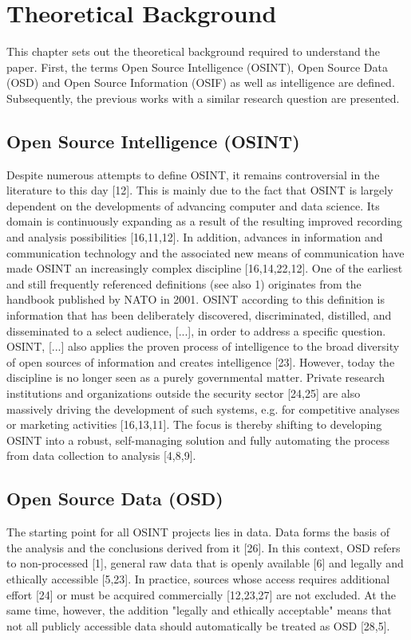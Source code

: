 \documentclass[10pt]{article}
\begin{document}
\section{Theoretical Background}

This chapter sets out the theoretical background required to understand the paper. First, the terms Open Source Intelligence (OSINT), Open Source Data (OSD) and Open Source Information (OSIF) as well as intelligence are defined. Subsequently, the previous works with a similar research question are presented.

\subsection{Open Source Intelligence (OSINT)}

Despite numerous attempts to define OSINT, it remains controversial in the literature to this day [12]. This is mainly due to the fact that OSINT is largely dependent on the developments of advancing computer and data science. Its domain is continuously expanding as a result of the resulting improved recording and analysis possibilities [16,11,12]. In addition, advances in information and communication technology and the associated new means of communication have made OSINT an increasingly complex discipline [16,14,22,12]. One of the earliest and still frequently referenced definitions (see also 1) originates from the handbook published by NATO in 2001. OSINT according to this definition is information that has been deliberately discovered, discriminated, distilled, and disseminated to a select audience, [...], in order to address a specific question. OSINT, [...] also applies the proven process of intelligence to the broad diversity of open sources of information and creates intelligence [23]. However, today the discipline is no longer seen as a purely governmental matter. Private research institutions and organizations outside the security sector [24,25] are also massively driving the development of such systems, e.g. for competitive analyses or marketing activities [16,13,11]. The focus is thereby shifting to developing OSINT into a robust, self-managing solution and fully automating the process from data collection to analysis [4,8,9].

\subsection{Open Source Data (OSD)}

The starting point for all OSINT projects lies in data. Data forms the basis of the analysis and the conclusions derived from it [26]. In this context, OSD refers to non-processed [1], general raw data that is openly available [6] and legally and ethically accessible [5,23]. In practice, sources whose access requires additional effort [24] or must be acquired commercially [12,23,27] are not excluded. At the same time, however, the addition "legally and ethically acceptable" means that not all publicly accessible data should automatically be treated as OSD [28,5].
\end{document}

